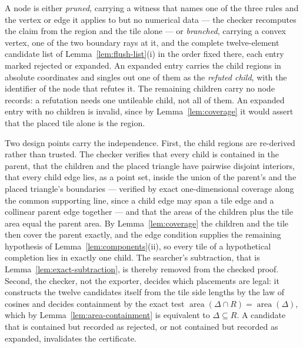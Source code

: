 \documentclass[11pt]{amsart}
\theoremstyle{definition}
\theoremstyle{remark}
\begin{document}
A node is either \emph{pruned}, carrying a witness that names one of the
three rules and the vertex or edge it applies to but no numerical data --- the
checker recomputes the claim from the region and the tile alone --- or
\emph{branched}, carrying a convex vertex, one of the two boundary rays at
it, and the complete twelve-element candidate list of
Lemma~\ref{lem:flush-list}(i) in the order fixed there, each entry marked
rejected or expanded.  An expanded entry carries the child regions in
absolute coordinates and singles out one of them as the \emph{refuted child},
with the identifier of the node that refutes it.  The remaining children
carry no node records: a refutation needs one untileable child, not all of
them.  An expanded entry with no children is invalid, since by
Lemma~\ref{lem:coverage} it would assert that the placed tile alone is the
region.

Two design points carry the independence.  First, the child regions are
re-derived rather than trusted.  The checker verifies that every child is
contained in the parent, that the children and the placed triangle have
pairwise disjoint interiors, that every child edge lies, as a point set,
inside the union of the parent's and the placed triangle's boundaries ---
verified by exact one-dimensional coverage along the common supporting line,
since a child edge may span a tile edge and a collinear parent edge
together --- and that the areas of
the children plus the tile area equal the parent area.  By
Lemma~\ref{lem:coverage} the children and the tile then cover the parent
exactly, and the edge condition supplies the remaining hypothesis of
Lemma~\ref{lem:components}(ii), so every tile of a hypothetical completion
lies in exactly one child.  The searcher's subtraction, that is
Lemma~\ref{lem:exact-subtraction}, is thereby removed from the checked proof.
Second, the checker, not the exporter, decides which placements are legal: it
constructs the twelve candidates itself from the tile side lengths by the law
of cosines and decides containment by the exact test
$\operatorname{area}(\Delta\cap R)=\operatorname{area}(\Delta)$, which by
Lemma~\ref{lem:area-containment} is equivalent to $\Delta\subseteq R$.  A
candidate that is contained but recorded as rejected, or not contained but
recorded as expanded, invalidates the certificate.
\end{document}
